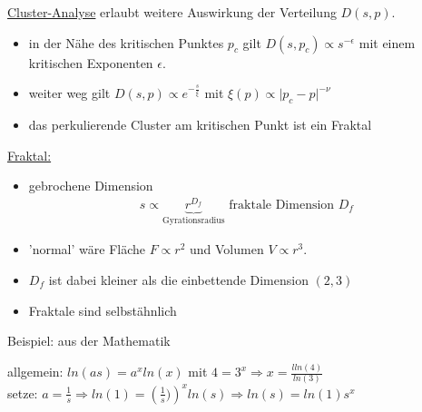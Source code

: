 \documentclass[12pt]{article}
\begin{document}
\underline{Cluster-Analyse} erlaubt weitere Auswirkung der Verteilung $D(s,p)$.
\begin{itemize}
\item in der Nähe des kritischen Punktes $p_c$ gilt $D(s,p_c) \propto s^{-\epsilon}$ mit einem kritischen Exponenten $\epsilon$.
\item weiter weg gilt $D(s,p) \propto e^{-\frac{s}{\xi}}$ mit $\xi (p) \propto \vert p_c - p \vert ^{- \nu}$
\item das perkulierende Cluster am kritischen Punkt ist ein Fraktal
\end{itemize}	 
\underline{Fraktal:} \begin{itemize}
	\item gebrochene Dimension \begin{align}
	s \propto \underbrace{r^{D_f}}_\text{Gyrationsradius} \mbox{ fraktale Dimension } D_f
\end{align}	 
\item 'normal' wäre Fläche $F \propto r^2$ und Volumen $V \propto r^3$.
\item $D_f$ ist dabei kleiner als die einbettende Dimension $(2,3)$
\item Fraktale sind selbstähnlich
\end{itemize}
Beispiel: aus der Mathematik %

allgemein: $ln(as)= a^x ln(x)$ mit $4=3^x \Rightarrow x= \frac{lln(4)}{ln(3)}$ \\
setze: $a= \frac{1}{s} \Rightarrow ln(1)= \left( \frac{1}{s}) \right)^x ln(s) \Rightarrow ln(s)= ln(1) s^x$
\end{document}
